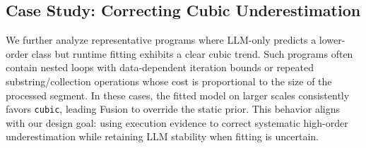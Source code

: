 \documentclass[conference]{IEEEtran}
\begin{document}
 \subsection{Case Study: Correcting Cubic Underestimation} 
 \label{subsec:case_study} 
 
 We further analyze representative programs where LLM-only predicts a lower-order class but runtime fitting 
 exhibits a clear cubic trend. Such programs often contain nested loops with data-dependent iteration bounds 
 or repeated substring/collection operations whose cost is proportional to the size of the processed segment. 
 In these cases, the fitted model on larger scales consistently favors \texttt{cubic}, leading Fusion to 
 override the static prior. This behavior aligns with our design goal: using execution evidence to correct 
 systematic high-order underestimation while retaining LLM stability when fitting is uncertain.
\end{document}
